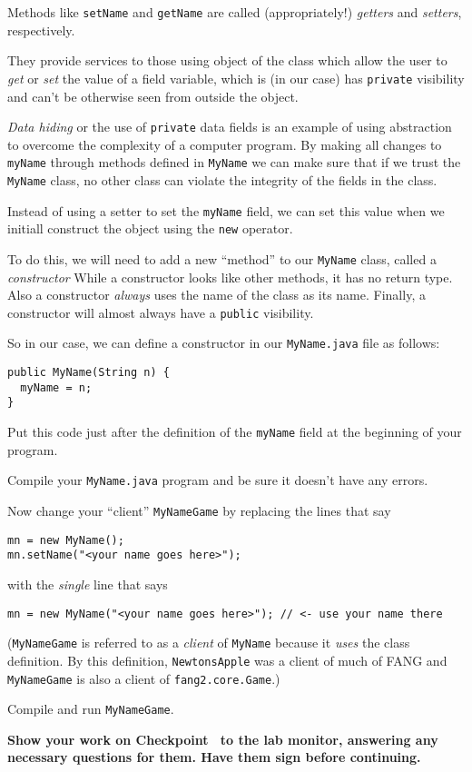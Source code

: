 \documentclass[12pt,twoside]{memoir}
\newcommand\code[1]{\lstinline^#1^}
\newenvironment{Checkpoint}[1]{%
\begin{Exercise}[name={Checkpoint},title={#1}]}{%
\end{Exercise}%
\textbf{Show your work on Checkpoint~\theExercise{} to the lab monitor, %
  answering any necessary questions for them.  Have them sign before continuing.}}
\begin{document}
\begin{Checkpoint}{Constructing your name}
  Methods like \code{setName} and \code{getName} are called
  (appropriately!) {\em getters} and {\em setters}, respectively.

  They provide services to those using object of the class which allow
  the user to {\em get} or {\em set} the value of a field variable,
  which is (in our case) has \code{private} visibility and can't be
  otherwise seen from outside the object.

  \emph{Data hiding} or the use of \code{private} data fields is an
  example of using abstraction to overcome the complexity of a
  computer program. By making all changes to \code{myName} through
  methods defined in \code{MyName} we can make sure that if we trust
  the \code{MyName} class, no other class can violate the integrity of
  the fields in the class.

  Instead of using a setter to set the \code{myName} field, we can set
  this value when we initiall construct the object using the
  \code{new} operator.

  To do this, we will need to add a new ``method'' to our
  \code{MyName} class, called a {\em constructor} While a constructor
  looks like other methods, it has no return type.  Also a constructor
  {\em always} uses the name of the class as its name.  Finally, a
  constructor will almost always have a \code{public} visibility.

  So in our case, we can define a constructor in our
  \code{MyName.java} file as follows:

\begin{lstlisting}
public MyName(String n) {
  myName = n;
}
\end{lstlisting}

Put this code just after the definition of the \code{myName} field at
the beginning of your program.

Compile your \code{MyName.java} program and be sure it doesn't have
any errors.

Now change your ``client'' \code{MyNameGame} by replacing
the lines that say

\begin{lstlisting}
mn = new MyName();
mn.setName("<your name goes here>");
\end{lstlisting}

with the {\em single} line that says

\begin{lstlisting}
mn = new MyName("<your name goes here>"); // <- use your name there
\end{lstlisting}

\noindent
(\code{MyNameGame} is referred to as a \emph{client} of \code{MyName}
because it \emph{uses} the class definition. By this definition,
\code{NewtonsApple} was a client of much of FANG and \code{MyNameGame}
is also a client of \code{fang2.core.Game}.)

Compile and run \code{MyNameGame}.
\end{Checkpoint}
\end{document}
